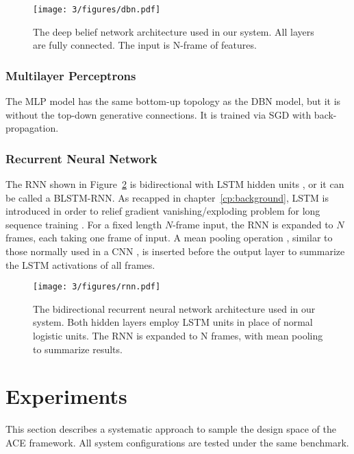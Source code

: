 \begin{figure}[htb]
\centering
\texttt{[image: 3/figures/dbn.pdf]}
\caption{The deep belief network architecture used in our system. All layers are fully connected. The input is N-frame of features.}
\label{fig:3-dbn}
\end{figure}

\subsubsection{Multilayer Perceptrons}
The MLP model has the same bottom-up topology as the DBN model, but it is without the top-down generative connections. It is trained via SGD with back-propagation.

\subsubsection{Recurrent Neural Network}

The RNN shown in Figure~\ref{fig:3-rnn} is bidirectional with LSTM hidden units \cite{hochreiter1997long}, or it can be called a BLSTM-RNN. As recapped in chapter~\ref{cp:background}, LSTM is introduced in order to relief gradient vanishing/exploding problem for long sequence training \cite{bengio2009learning}. For a fixed length $N$-frame input, the RNN is expanded to $N$ frames, each taking one frame of input. A mean pooling operation \cite{maas2011learning}, similar to those normally used in a CNN \cite{lecun1995convolutional}, is inserted before the output layer to summarize the LSTM activations of all frames.
\begin{figure}[h]
\centering
\texttt{[image: 3/figures/rnn.pdf]}
\caption{The bidirectional recurrent neural network architecture used in our system. Both hidden layers employ LSTM units in place of normal logistic units. The RNN is expanded to N frames, with mean pooling to summarize results.}
\label{fig:3-rnn}
\end{figure}

\section{Experiments} \label{sec:3-exper}
This section describes a systematic approach to sample the design space of the ACE framework. All system configurations are tested under the same benchmark. %

